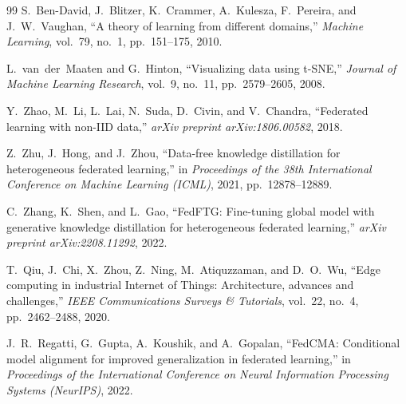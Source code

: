 \documentclass[12pt,a4paper]{report}
\begin{document}
\begin{thebibliography}{99}
S.~Ben-David, J.~Blitzer, K.~Crammer, A.~Kulesza, F.~Pereira, and J.~W.~Vaughan, ``A theory of learning from different domains,'' \textit{Machine Learning}, vol.~79, no.~1, pp.~151--175, 2010.

L.~van~der~Maaten and G.~Hinton, ``Visualizing data using t-SNE,'' \textit{Journal of Machine Learning Research}, vol.~9, no.~11, pp.~2579--2605, 2008.

Y.~Zhao, M.~Li, L.~Lai, N.~Suda, D.~Civin, and V.~Chandra, ``Federated learning with non-IID data,'' \textit{arXiv preprint arXiv:1806.00582}, 2018.

Z.~Zhu, J.~Hong, and J.~Zhou, ``Data-free knowledge distillation for heterogeneous federated learning,'' in \textit{Proceedings of the 38th International Conference on Machine Learning (ICML)}, 2021, pp.~12878--12889.

C.~Zhang, K.~Shen, and L.~Gao, ``FedFTG: Fine-tuning global model with generative knowledge distillation for heterogeneous federated learning,'' \textit{arXiv preprint arXiv:2208.11292}, 2022.

T.~Qiu, J.~Chi, X.~Zhou, Z.~Ning, M.~Atiquzzaman, and D.~O.~Wu, ``Edge computing in industrial Internet of Things: Architecture, advances and challenges,'' \textit{IEEE Communications Surveys \& Tutorials}, vol.~22, no.~4, pp.~2462--2488, 2020.

J.~R.~Regatti, G.~Gupta, A.~Koushik, and A.~Gopalan, ``FedCMA: Conditional model alignment for improved generalization in federated learning,'' in \textit{Proceedings of the International Conference on Neural Information Processing Systems (NeurIPS)}, 2022.

\end{thebibliography}
\end{document}
